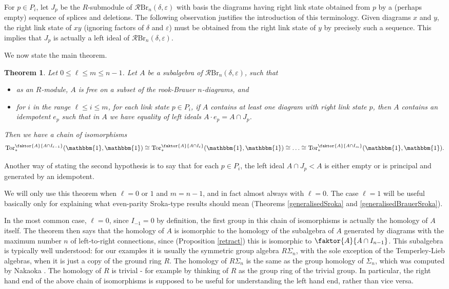 \documentclass[12pt]{amsart}
\theoremstyle{plain}
\newtheorem{theorem}{Theorem}[section]
\theoremstyle{definition} \newtheorem{definition}[theorem]{Definition}
\theoremstyle{plain}
\theoremstyle{plain} \newtheorem{proposition}[theorem]{Proposition}
\theoremstyle{plain} \newtheorem{conjecture}[theorem]{Conjecture}
\theoremstyle{plain} \newtheorem{corollary}[theorem]{Corollary}
\theoremstyle{remark} \newtheorem{claim}[theorem]{Claim}
\theoremstyle{remark} \newtheorem{remark}[theorem]{Remark}
\theoremstyle{remark} \newtheorem{example}[theorem]{Example}
\theoremstyle{remark} \newtheorem{comment}[theorem]{Comment}
\theoremstyle{definition} \newtheorem{question}[theorem]{Question}
\renewcommand{\t}{\mathbbm{1}}
\newcommand{\rook}{\mathcal{R}}
\newcommand{\Tor}{\mathrm{Tor}}
\newcommand{\Brauer}{\mathrm{Br}}
\newcommand{\mOne}{splice}
\newcommand{\mTwo}{deletion}
\begin{document}
For $p \in P_i$, let $J_p$ be the $R$-submodule of $\rook \Brauer_n(\delta, \varepsilon)$ with basis the diagrams having right link state obtained from $p$ by a (perhaps empty) sequence of {\mOne}s and {\mTwo}s. The following observation justifies the introduction of this terminology. Given diagrams $x$ and $y$, the right link state of $xy$ (ignoring factors of $\delta$ and $\varepsilon$) must be obtained from the right link state of $y$ by precisely such a sequence. This implies that $J_p$ is actually a left ideal of $\rook \Brauer_n(\delta, \varepsilon)$.

\newpage

We now state the main theorem.

\begin{theorem} \label{subalgebraOfBrauer} Let $0 \leq \ell \leq m \leq n-1$. Let $A$ be a subalgebra of $\rook \Brauer_n(\delta, \varepsilon)$, such that \begin{itemize}
    \item as an $R$-module, $A$ is free on a subset of the rook-Brauer $n$-diagrams, and
    \item for $i$ in the range $\ell \leq i \leq m$, for each link state $p \in P_i$, if $A$ contains at least one diagram with right link state $p$, then $A$ contains an idempotent $e_p$ such that in $A$ we have equality of left ideals $A \cdot e_p = A \cap J_p$.
\end{itemize}
Then we have a chain of isomorphisms $$\Tor^{\faktor{A}{A \cap I_{\ell-1}}}_*(\t,\t) \cong \Tor^{\faktor{A}{A \cap I_{\ell}}}_*(\t,\t) \cong \dots \cong \Tor^{\faktor{A}{A \cap I_{m}}}_*(\t,\t).$$ \end{theorem}

Another way of stating the second hypothesis is to say that for each $p \in P_i$, the left ideal $A \cap J_p < A$ is either empty or is principal and generated by an idempotent.

We will only use this theorem when $\ell=0$ or $1$ and $m = n-1$, and in fact almost always with $\ell = 0$. The case $\ell = 1$ will be useful basically only for explaining what even-parity Sroka-type results should mean (Theorems \ref{generalisedSroka} and \ref{generalisedBrauerSroka}).

In the most common case, $\ell=0$, since $I_{-1}=0$ by definition, the first group in this chain of isomorphisms is actually the homology of $A$ itself. The theorem then says that the homology of $A$ is isomorphic to the homology of the subalgebra of $A$ generated by diagrams with the maximum number $n$ of left-to-right connections, since (Proposition \ref{retract}) this is isomorphic to $\faktor{A}{A \cap I_{n-1}}$. This subalgebra is typically well understood: for our examples it is usually the symmetric group algebra $R \Sigma_n$, with the sole exception of the Temperley-Lieb algebras, when it is just a copy of the ground ring $R$. The homology of $R \Sigma_n$ is the same as the group homology of $\Sigma_n$, which was computed by Nakaoka \cite{Nakaoka}. The homology of $R$ is trivial - for example by thinking of $R$ as the group ring of the trivial group. In particular, the right hand end of the above chain of isomorphisms is supposed to be useful for understanding the left hand end, rather than vice versa.
\end{document}
